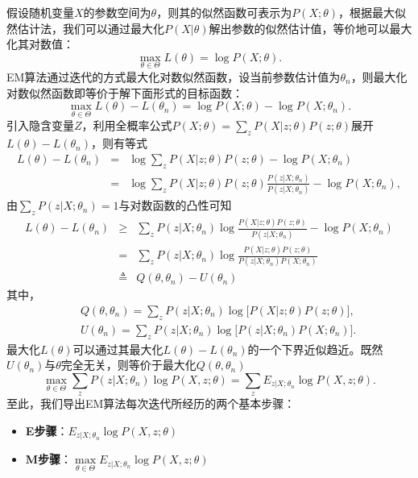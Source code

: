 假设随机变量$X$的参数空间为$\theta$，则其的似然函数可表示为$P(X; \theta)$，根据最大似然估计法，我们可以通过最大化$P(X|\theta)$解出参数的似然估计值，等价地可以最大化其对数值：
\begin{equation}
  \max\limits_{\theta\in \Theta} L(\theta) = \log P(X; \theta).
\end{equation}
EM算法通过迭代的方式最大化对数似然函数，设当前参数估计值为$\theta_n$，则最大化对数似然函数即等价于解下面形式的目标函数：
\begin{equation}
  \max\limits_{\theta\in \Theta} L(\theta) - L(\theta_n) = \log P(X; \theta) - \log P(X; \theta_n).
\end{equation}
引入隐含变量$Z$，利用全概率公式$P(X; \theta) = \sum\limits_z P(X| z;\theta)P(z;\theta)$展开$L(\theta) - L(\theta_n)$，则有等式
\begin{equation}
\begin{array}{lcl}
  L(\theta) - L(\theta_n)  & = & \log\sum\limits_z P(X| z;\theta)P(z;\theta) - \log P(X;\theta_n) \\
  & = & \log\sum\limits_z P(X|z;\theta)P(z;\theta) \frac{P(z| X;\theta_n)}{P(z| X;\theta_n)} - \log P(X; \theta_n),
\end{array}
\end{equation}
由$\sum\limits_z P(z| X;\theta_n) = 1$与对数函数的凸性可知
\begin{eqnarray}
  L(\theta) - L(\theta_n) & \ge & \sum\limits_z P(z| X;\theta_n) \log \frac{P(X| z;\theta)P(z;\theta)}{P(z| X;\theta_n)} - \log P(X; \theta_n)\\
  & = & \sum\limits_z P(z| X;\theta_n) \log \frac{P(X|z;\theta)P(z;\theta)}{P(z| X;\theta_n)P(X;\theta_n)}\\
  & \triangleq & Q(\theta, \theta_n) - U(\theta_n)
\end{eqnarray}
其中，
\begin{eqnarray}
  &&Q(\theta, \theta_n) =  \sum\limits_z P(z|X;\theta_n) \log \big[P(X|z; \theta)P(z;\theta)\big],\\
  &&U(\theta_n) = \sum\limits_z P(z|X;\theta_n) \log \big[P(z|X; \theta_n)P(X;\theta_n)\big].
\end{eqnarray}
最大化$L(\theta)$可以通过其最大化$L(\theta) - L(\theta_n)$的一个下界近似趋近。既然$U(\theta_n)$与$\theta$完全无关，则等价于最大化$Q(\theta, \theta_n)$
\begin{equation}
    \max\limits_{\theta\in \Theta} \sum\limits_z P(z|X;\theta_n) \log P(X,z; \theta) = \sum\limits_z E_{z|X;\theta_n} \log P(X,z; \theta).
\end{equation}
至此，我们导出EM算法每次迭代所经历的两个基本步骤：
\begin{itemize}
  \item \textbf{E步骤}：$E_{z|X;\theta_n} \log P(X,z;\theta)$
  \item \textbf{M步骤}：$\max\limits_{\theta\in \Theta} E_{z|X;\theta_n} \log P(X,z;\theta)$
\end{itemize}


